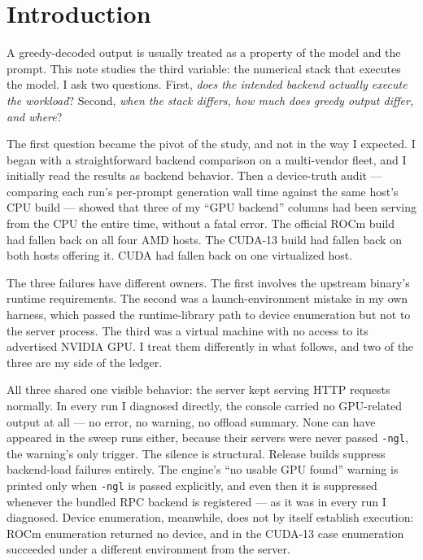 \documentclass[11pt]{article}
\begin{document}
\section{Introduction}\label{sec:intro}

A greedy-decoded output is usually treated as a property of the model
and the prompt. This note studies the third variable: the numerical
stack that executes the model. I ask two questions. First,
\emph{does the intended backend actually execute the workload}?
Second, \emph{when the stack differs, how much does greedy output
differ, and where}?

The first question became the pivot of the study, and not in the way I
expected. I began with a straightforward backend comparison on a
multi-vendor fleet, and I initially read the results as backend
behavior. Then a device-truth audit --- comparing each run's
per-prompt generation wall time against the same host's CPU build ---
showed that three of my ``GPU backend'' columns had been serving from
the CPU the entire time, without a fatal error. The official ROCm
build had fallen back on all four AMD hosts. The CUDA-13 build had
fallen back on both hosts offering it. CUDA had fallen back on one
virtualized host.

The three failures have different owners. The first involves the
upstream binary's runtime requirements. The second was a
launch-environment mistake in my own harness, which passed the
runtime-library path to device enumeration but not to the server
process. The third was a virtual machine with no access to its
advertised NVIDIA GPU. I treat them differently in what follows, and
two of the three are my side of the ledger.

All three shared one visible behavior: the server kept serving HTTP
requests normally. In every run I diagnosed directly, the console
carried no GPU-related output at all --- no error, no warning, no
offload summary. None can have appeared in the sweep runs either,
because their servers were never passed \texttt{-ngl}, the warning's
only trigger. The silence is structural. Release builds suppress
backend-load failures entirely. The engine's ``no usable GPU found''
warning is printed only when \texttt{-ngl} is passed explicitly, and
even then it is suppressed whenever the bundled RPC backend is
registered --- as it was in every run I diagnosed. Device enumeration,
meanwhile, does not by itself establish execution: ROCm enumeration
returned no device, and in the CUDA-13 case enumeration succeeded
under a different environment from the server.
\end{document}
